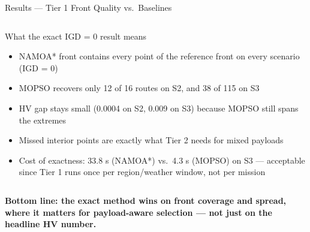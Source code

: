 \documentclass[aspectratio=169,11pt]{beamer}
\newcommand{\compactblocks}{\setbeamerfont{block title}{size=\small}}
\begin{document}
\begin{frame}{Results --- Tier 1 Front Quality vs.\ Baselines}
  \compactblocks
  \begin{columns}[T,onlytextwidth]
      \centering
      \begin{block}{What the exact IGD = 0 result means}
        \scriptsize
        \begin{itemize}
          \item NAMOA* front contains every point of the reference front on every scenario (IGD = 0)
          \item MOPSO recovers only 12 of 16 routes on S2, and 38 of 115 on S3
          \item HV gap stays small (0.0004 on S2, 0.009 on S3) because MOPSO still spans the extremes
          \item Missed interior points are exactly what Tier 2 needs for mixed payloads
          \item Cost of exactness: 33.8 s (NAMOA*) vs.\ 4.3 s (MOPSO) on S3 --- acceptable since Tier 1 runs once per region/weather window, not per mission
        \end{itemize}
      \end{block}
  \end{columns}
  \vspace{2mm}

  {\footnotesize\textbf{Bottom line: the exact method wins on front coverage and spread, where it matters for payload-aware selection --- not just on the headline HV number.}}
\end{frame}
\end{document}
